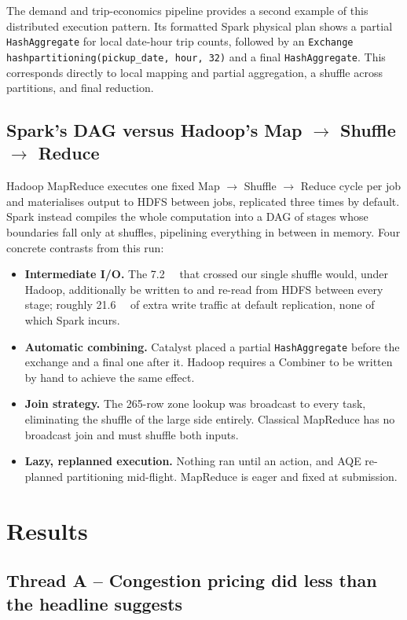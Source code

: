 \documentclass[10pt,a4paper]{article}
\begin{document}
The demand and trip-economics pipeline provides a second
example of this distributed execution pattern. Its formatted Spark
physical plan shows a partial \texttt{HashAggregate} for local
date-hour trip counts, followed by an
\texttt{Exchange hashpartitioning(pickup\_date, hour, 32)} and a
final \texttt{HashAggregate}. This corresponds directly to local
mapping and partial aggregation, a shuffle across partitions, and
final reduction.

\subsection{Spark's DAG versus Hadoop's Map $\to$ Shuffle $\to$ Reduce}

Hadoop MapReduce executes one fixed Map $\to$ Shuffle $\to$ Reduce cycle per
job and materialises output to HDFS between jobs, replicated three times by
default. Spark instead compiles the whole computation into a DAG of stages whose
boundaries fall only at shuffles, pipelining everything in between in memory.
Four concrete contrasts from this run:

\begin{itemize}\itemsep1pt \parskip0pt
\item \textbf{Intermediate I/O.} The \SI{7.2}{\gibi\byte} that crossed our single
shuffle would, under Hadoop, additionally be written to and re-read from HDFS
between every stage; roughly \SI{21.6}{\gibi\byte} of extra write traffic at
default replication, none of which Spark incurs.
\item \textbf{Automatic combining.} Catalyst placed a partial
\texttt{HashAggregate} before the exchange and a final one after it. Hadoop
requires a Combiner to be written by hand to achieve the same effect.
\item \textbf{Join strategy.} The 265-row zone lookup was broadcast to every
task, eliminating the shuffle of the large side entirely. Classical MapReduce has
no broadcast join and must shuffle both inputs.
\item \textbf{Lazy, replanned execution.} Nothing ran until an action, and AQE
re-planned partitioning mid-flight. MapReduce is eager and fixed at submission.
\end{itemize}

\section{Results}

\subsection{Thread A -- Congestion pricing did less than the headline suggests}
\end{document}
